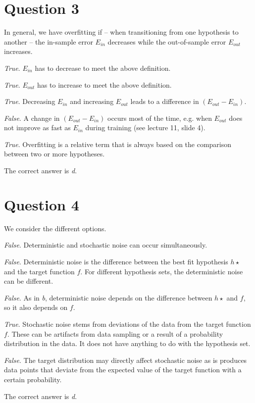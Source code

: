 \documentclass[	11pt,
				a4paper,
				twoside,
				titlepage,
				bibtotoc,
				openright,
				cleardoublepage=empty
				]{scrartcl}
\begin{document}
\section{Question 3} %
In general, we have overfitting if -- when transitioning from one hypothesis to another -- the in-sample error $E_{\textit{in}}$ decreases while the out-of-sample error $E_{\textit{out}}$ increases.\\
\begin{alnum}
	\item 	\emph{True}. $E_{in}$ has to decrease to meet the above definition.
	\item	\emph{True}. $E_{out}$ has to increase to meet the above definition.
	\item	\emph{True}. Decreasing $E_{in}$ and increasing $E_{out}$ leads to a difference in $(E_{out} - E_{in})$.
	\item	\emph{False}. A change in $(E_{out} - E_{in})$ occurs most of the time, e.g. when $E_{out}$ does not improve as fast as $E_{in}$ during training (see lecture 11, slide 4).
	\item	\emph{True}. Overfitting is a relative term that is always based on the comparison between two or more hypotheses.
\end{alnum}

The correct answer is \emph{d}.
\vspace{\baselineskip}




\section{Question 4} %
We consider the different options.
\begin{alnum}
	\item 	\emph{False}. Deterministic and stochastic noise can occur simultaneously.
	\item	\emph{False}. Deterministic noise is the difference between the best fit hypothesis $h\star$ and the target function $f$. For different hypothesis sets, the deterministic noise can be different.
	\item	\emph{False}. As in \emph{b}, deterministic noise depends on the difference between $h\star$ and $f$, so it also depends on $f$.
	\item	\emph{True}. Stochastic noise stems from deviations of the data from the target function $f$. These can be artifacts from data sampling or a result of a probability distribution in the data. It does not have anything to do with the hypothesis set.
	\item	\emph{False}. The target distribution may directly affect stochastic noise as is produces data points that deviate from the expected value of the target function with a certain probability.
\end{alnum}
The correct answer is \emph{d}.
\vspace{\baselineskip}
\end{document}
